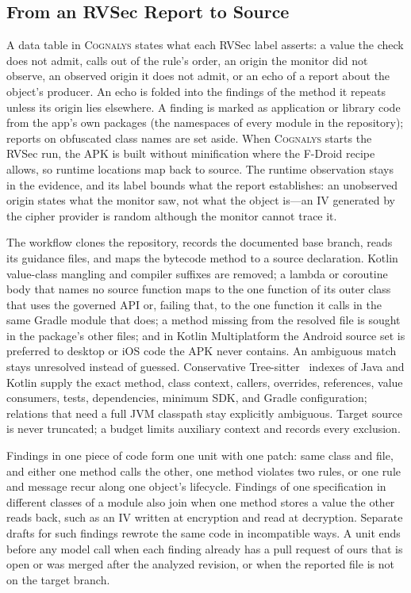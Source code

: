 \documentclass[conference]{IEEEtran}
\newcommand{\system}{\textsc{Cognalys}}
\begin{document}
\subsection{From an RVSec Report to Source}

A data table in \system{} states what each RVSec label asserts: a value the
check does not admit, calls out of the rule's order, an origin the monitor did
not observe, an observed origin it does not admit, or an echo of a report about
the object's producer. An echo is folded into the findings of the method it
repeats unless its origin lies elsewhere. A finding is marked as application or
library code from the app's own packages (the namespaces of every module in the
repository); reports on obfuscated class names are set aside. When \system{}
starts the RVSec run, the APK is built without minification where the F-Droid
recipe allows, so runtime locations map back to source. The runtime observation
stays in the evidence, and its label bounds what the report establishes: an
unobserved origin states what the monitor saw, not what the object is---an IV
generated by the cipher provider is random although the monitor cannot trace
it.

The workflow clones the repository, records the documented base branch, reads
its guidance files, and maps the bytecode method to a source declaration.
Kotlin value-class mangling and compiler suffixes are removed; a lambda or
coroutine body that names no source function maps to the one function of its
outer class that uses the governed API or, failing that, to the one function it
calls in the same Gradle module that does; a method missing from the resolved
file is sought in the package's other files; and in Kotlin Multiplatform the
Android source set is preferred to desktop or iOS code the APK never contains.
An ambiguous match stays unresolved instead of guessed. Conservative
Tree-sitter~\cite{treesitter} indexes of Java and Kotlin supply the exact method, class context,
callers, overrides, references, value consumers, tests, dependencies, minimum
SDK, and Gradle configuration; relations that need a full JVM classpath stay
explicitly ambiguous. Target source is never truncated; a budget limits
auxiliary context and records every exclusion.

Findings in one piece of code form one unit with one patch: same class and
file, and either one method calls the other, one method violates two rules, or
one rule and message recur along one object's lifecycle. Findings of one
specification in different classes of a module also join when one method
stores a value the other reads back, such as an IV written at encryption and
read at decryption. Separate drafts for such findings rewrote the same code in
incompatible ways. A unit ends before any model call when each finding already
has a pull request of ours that is open or was merged after the analyzed
revision, or when the reported file is not on the target branch.
\end{document}
